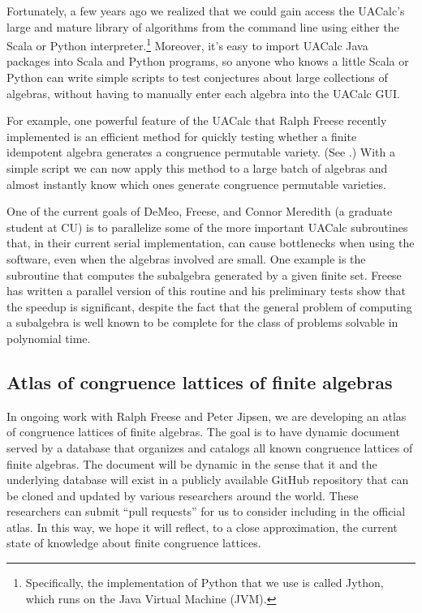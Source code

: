 \documentclass[12pt]{amsart}  %
\begin{document}
Fortunately, a few years ago we realized that we could gain access the UACalc's
large and mature library of algorithms from the command line using either the 
Scala or Python interpreter.\footnote{Specifically, the implementation of Python that we 
use is called Jython, which runs on the Java Virtual
Machine (JVM).} Moreover, it's easy to import  UACalc Java packages
into Scala and Python programs, so anyone who knows a little Scala or Python 
can write simple scripts to test conjectures about large collections of
algebras, without having to manually enter each algebra into the UACalc
GUI.

For example, one powerful feature of the UACalc that Ralph Freese recently
implemented is an efficient method for quickly testing whether a finite
idempotent algebra generates a congruence permutable variety.  (See
\cite[Theorem 5.1]{Freese:2009}.)  With a simple script we can now apply
this method to a large batch of algebras and almost instantly know which ones
generate congruence permutable varieties.

One of the current goals of DeMeo, Freese, and Connor Meredith 
(a graduate student at CU) is to parallelize some of the more
important UACalc subroutines that, in their current serial implementation, can
cause bottlenecks when using the software, even when the 
algebras involved are small.  One example is the subroutine that 
computes the subalgebra generated by a given finite set.  Freese has written a 
parallel version of this routine and his preliminary tests show that the 
speedup is significant, despite the fact that the general problem of computing 
a subalgebra is well known to be complete for the class of problems solvable in 
polynomial time.

\subsection{Atlas of congruence lattices of finite algebras}
\label{sec:atlas-congr-latt}

In ongoing work with Ralph Freese and Peter Jipsen, we are developing an
atlas of congruence lattices of finite algebras. The goal is to have dynamic
document served by a database that organizes and catalogs all known congruence
lattices of finite algebras. The document will be dynamic in the sense that it
and the underlying database will exist in a publicly available GitHub repository
that can be cloned and updated by various researchers around the world.  These
researchers can submit ``pull requests'' for us to consider including in the
official atlas.  In this way, we hope it will reflect, to a close approximation,
the current state of knowledge about finite congruence lattices.  
\end{document}
